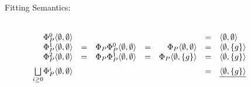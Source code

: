 \begin{Loesung}
\begin{UList}
\begin{description}
 \item[Fitting Semantics:] ~\\
   \(
   \begin{array}{rcrcrcl}
     \Phi^0_P\langle \emptyset,\emptyset\rangle & & & & & = &
     \langle\emptyset,\emptyset\rangle \\
     \Phi^1_P\langle \emptyset,\emptyset\rangle & = & 
     \Phi_P\Phi^0_P\langle \emptyset,\emptyset\rangle & = &
     \Phi_P\langle \emptyset,\emptyset\rangle & = & 
     \langle\emptyset,\{g\}\rangle \\
     \Phi^2_P\langle \emptyset,\emptyset\rangle & = & 
     \Phi_P\Phi^1_P\langle \emptyset,\emptyset\rangle & = &
     \Phi_P\langle \emptyset,\{g\}\rangle & = & 
     \langle\emptyset,\{g\}\rangle \\[2mm]
     \underset{i\geq 0}{\bigsqcup}\Phi^i_P\langle \emptyset,\emptyset\rangle 
     & & & & & = & \underline{\langle\emptyset,\{g\}\rangle}
   \end{array}
   \)


\end{description}
\end{UList}
\end{Loesung}
